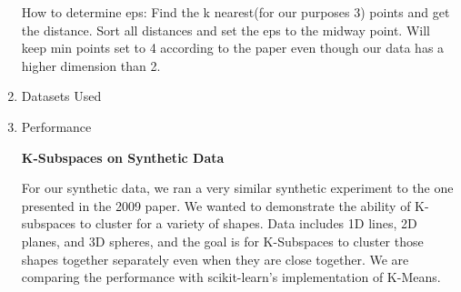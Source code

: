 \documentclass[12pt]{article}
\begin{document}
\begin{enumerate}
How to determine eps:
Find the k nearest(for our purposes 3) points and get the distance. Sort all distances and set the eps to the midway point. Will keep min points set to 4 according to the paper even though our data has a higher dimension than 2.

\item Datasets Used

\item Performance

\textbf{K-Subspaces on Synthetic Data}

For our synthetic data, we ran a very similar synthetic experiment to the one presented in the 2009 paper. We wanted to demonstrate the ability of K-subspaces to cluster for a variety of shapes. Data includes 1D lines, 2D planes, and 3D spheres, and the goal is for K-Subspaces to cluster those shapes together separately even when they are close together. We are comparing the performance with scikit-learn's implementation of K-Means. 


\end{enumerate}
\end{document}
